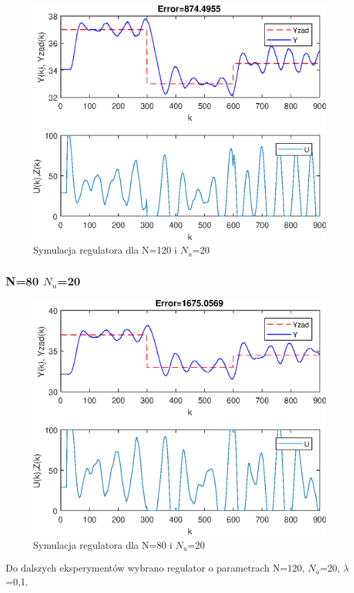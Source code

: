 \begin{figure}[h!]
	\centering
	\includegraphics[scale=1]{Rys/N=120Nu=20lambda=0.1.eps}
	\caption{Symulacja regulatora dla N=120 i $N_{u}$=20}
	\label{nnu2}
\end{figure}

\FloatBarrier
\subsubsection{ N=80 $N_{u}$=20}

\begin{figure}[h!]
	\centering
	\includegraphics[scale=1]{Rys/N=80Nu=20lambda=0.1.eps}
	\caption{Symulacja regulatora dla N=80 i $N_{u}$=20}
	\label{nnu3}
\end{figure}

\FloatBarrier

Do dalszych eksperymentów wybrano regulator o parametrach   N=120, $N_{u}$=20, $\lambda$=0,1.